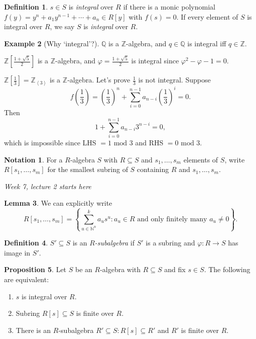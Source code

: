 \documentclass[a4paper]{article}
\newcommand{\la}{\left\langle}
\newcommand{\ra}{\right\rangle}
\newcommand{\Z}{\mathbb Z}
\newcommand{\Q}{\mathbb Q}
\newcommand{\Mod}{\text{ mod }}
\theoremstyle{definition}
\newtheorem{defn}{Definition}[subsection]
\newtheorem{prop}[defn]{Proposition}
\newtheorem{lemma}[defn]{Lemma}
\newtheorem{example}[defn]{Example}
\newtheorem*{notation}{Notation}
\begin{document}
\begin{defn}
$s\in S$ is \textit{integral} over $R$ if there is a monic polynomial $f(y)=y^n+a_1y^{n-1}+\cdots+a_n\in R[y]$ with $f(s)=0$. If every element of $S$ is integral over $R$, we say $S$ is \textit{integral} over $R$.
\end{defn}
\begin{example}[Why `integral'?]
$\Q$ is a $\Z$-algebra, and $q\in\Q$ is integral iff $q\in\Z$.

$\Z\left[\frac{1+\sqrt5}{2}\right]$ is a $\Z$-algebra, and $\varphi=\frac{1+\sqrt5}{2}$ is integral since $\varphi^2-\varphi-1=0$.

$\Z\left[\frac13\right]=\Z_{\la3\ra}$ is a $\Z$-algebra. Let's prove $\frac13$ is not integral. Suppose
\[
f\left(\frac13\right)=\left(\frac13\right)^n+\sum_{i=0}^{n-1} a_{n-i}\left(\frac13\right)^i=0.
\]
Then
\[
1+\sum_{i=0}^{n-1}a_{n-i}3^{n-i}=0,
\]
which is impossible since LHS $=1\Mod 3$ and RHS $=0\Mod 3$.
\end{example}

\begin{notation}
For a $R$-algebra $S$ with $R\subseteq S$ and $s_1,\ldots,s_m$ elements of $S$, write $R[s_1,\ldots,s_m]$ for the smallest subring of $S$ containing $R$ and $s_1,\ldots,s_m$.
\end{notation}

\begin{flushright}
\textit{Week 7, lecture 2 starts here}
\end{flushright}

\begin{lemma}
We can explicitly write
\[
R[s_1,\ldots,s_m]=\left\{ \sum_{u\in\mathbb N^n}^k a_u s^u:a_u\in R \text{ and only finitely many } a_u\neq 0\right\}.
\]
\end{lemma}

\begin{defn}
$S'\subseteq S$ is an $R$\textit{-subalgebra} if $S'$ is a subring and $\varphi:R\rightarrow S$ has image in $S'$.
\end{defn}

\begin{prop}
\label{prop:sintthenRsfinite}
Let $S$ be an $R$-algebra with $R\subseteq S$ and fix $s\in S$. The following are equivalent:
\begin{enumerate}
\item $s$ is integral over $R$.
\item Subring $R[s]\subseteq S$ is finite over $R$.
\item There is an $R$-subalgebra $R'\subseteq S:R[s]\subseteq R'$ and $R'$ is finite over $R$.
\end{enumerate}
\end{prop}
\end{document}
